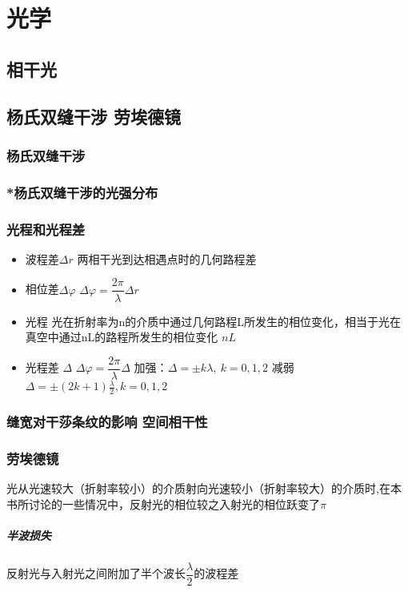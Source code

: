 \documentclass[UTF8,a4paper,12pt,scheme=chinese]{ctexbook}
\begin{document}
	\chapter{光学}
	\section{相干光}
	\section{杨氏双缝干涉 劳埃德镜}
	\subsection{杨氏双缝干涉}
	\subsection{*杨氏双缝干涉的光强分布}
	\subsection{光程和光程差}
	\begin{itemize}
		\item 波程差$ \Delta r $
		\subitem 两相干光到达相遇点时的几何路程差
		\item 相位差$ \Delta\varphi$
		\subitem $ \Delta\varphi=\dfrac{2\pi}{\lambda}\Delta r $
		\item 光程
		\subitem 光在折射率为n的介质中通过几何路程L所发生的相位变化，相当于光在真空中通过nL的路程所发生的相位变化
		\subitem $ nL $
		\item 光程差 $ \Delta $
		\subitem $ \Delta\varphi=\dfrac{2\pi}{\lambda}\Delta $
		\subitem 加强：$ \Delta=\pm k\lambda ,\ k = 0,1,2$
		\subitem 减弱 $\Delta  =  \pm \left( {2k + 1} \right)\frac{\lambda }{2},k = 0,1,2$
	\end{itemize}
	\subsection{缝宽对干莎条纹的影响 空间相干性}
	\subsection{劳埃德镜}
	光从光速较大（折射率较小）的介质射向光速较小（折射率较大）的介质时,在本书所讨论的一些情况中，反射光的相位较之入射光的相位跃变了$ \pi $
	\paragraph{半波损失} 反射光与入射光之间附加了半个波长$ \dfrac{\lambda}{2} $的波程差
\end{document}
